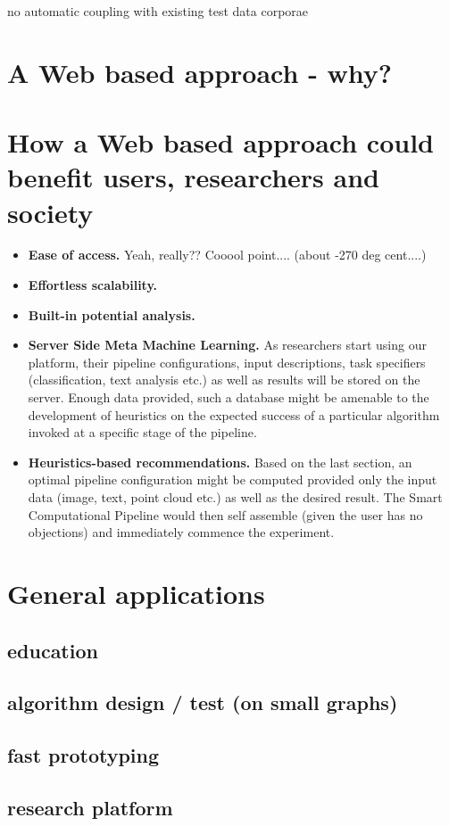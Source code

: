 no automatic coupling with existing test data corporae 



\section{A Web based approach - why?}
\label{sect:web_transition}



\section{How a Web based approach could benefit users, researchers and society}
\label{sect:web_benefits}

\begin{itemize}
	\item \textbf{Ease of access.} Yeah, really?? Cooool point.... (about -270 deg cent....)
	\item \textbf{Effortless scalability.}
	\item \textbf{Built-in potential analysis.}
	\item \textbf{Server Side Meta Machine Learning.} As researchers start using our platform, their pipeline configurations, input descriptions, task specifiers (classification, text analysis etc.) as well as results will be stored on the server. Enough data provided, such a database might be amenable to the development of heuristics on the expected success of a particular algorithm invoked at a specific stage of the pipeline.
	\item \textbf{Heuristics-based recommendations.} Based on the last section, an optimal pipeline configuration might be computed provided only the input data (image, text, point cloud etc.) as well as the desired result. The Smart Computational Pipeline would then self assemble (given the user has no objections) and immediately commence the experiment.
\end{itemize}



\section{General applications}
\label{sect:ogma_focal_points}

\subsection{education}
\label{ssect:education}

\subsection{algorithm design / test (on small graphs)}
\label{ssect:algodesign}

\subsection{fast prototyping}
\label{ssect:prototyping}

\subsection{research platform}
\label{ssect:research}

